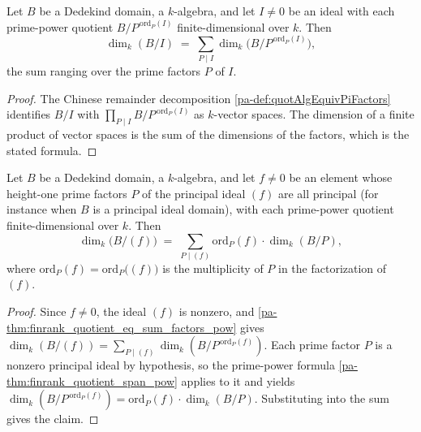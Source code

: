 \begin{theorem}
  \label{pa-thm:finrank_quotient_eq_sum_factors_pow}
  \leanok

  Let \(B\) be a Dedekind domain, a \(k\)-algebra, and let \(I \neq 0\) be an ideal with each
  prime-power quotient \(B/P^{\,\mathrm{ord}_P(I)}\) finite-dimensional over \(k\). Then
  \[
    \dim_k(B/I) \;=\; \sum_{P \mid I} \dim_k\bigl(B/P^{\,\mathrm{ord}_P(I)}\bigr) ,
  \]
  the sum ranging over the prime factors \(P\) of \(I\).
\end{theorem}
\begin{proof}
  \leanok
  The Chinese remainder decomposition \ref{pa-def:quotAlgEquivPiFactors} identifies
  \(B/I\) with \(\prod_{P \mid I} B/P^{\,\mathrm{ord}_P(I)}\) as \(k\)-vector spaces.
  The dimension of a finite product of vector spaces is the sum of the dimensions of
  the factors, which is the stated formula.
\end{proof}

\begin{theorem}
  \label{pa-thm:finrank_quotient_span_eq_sum_ord}
  \leanok

  Let \(B\) be a Dedekind domain, a \(k\)-algebra, and let \(f \neq 0\) be an element whose
  height-one prime factors \(P\) of the principal ideal \((f)\) are all principal (for instance
  when \(B\) is a principal ideal domain), with each prime-power quotient finite-dimensional
  over \(k\). Then
  \[
    \dim_k\bigl(B/(f)\bigr) \;=\; \sum_{P \mid (f)} \mathrm{ord}_P(f) \cdot \dim_k(B/P) ,
  \]
  where \(\mathrm{ord}_P(f) = \mathrm{ord}_P\bigl((f)\bigr)\) is the multiplicity of \(P\) in
  the factorization of \((f)\).
\end{theorem}
\begin{proof}
  \leanok
  Since \(f \neq 0\), the ideal \((f)\) is nonzero, and \ref{pa-thm:finrank_quotient_eq_sum_factors_pow}
  gives \(\dim_k(B/(f)) = \sum_{P \mid (f)} \dim_k(B/P^{\,\mathrm{ord}_P(f)})\). Each prime
  factor \(P\) is a nonzero principal ideal by hypothesis, so the prime-power formula
  \ref{pa-thm:finrank_quotient_span_pow} applies to it and yields
  \(\dim_k(B/P^{\,\mathrm{ord}_P(f)}) = \mathrm{ord}_P(f) \cdot \dim_k(B/P)\). Substituting into
  the sum gives the claim.
\end{proof}

